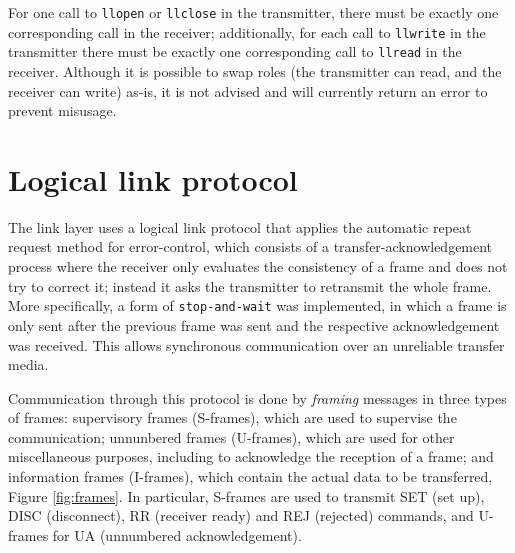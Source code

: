 \documentclass[a4paper, 11pt]{report}
\begin{document}
For one call to \texttt{llopen} or \texttt{llclose} in the transmitter, there must be exactly one corresponding call in the receiver; additionally, for each call to \texttt{llwrite} in the transmitter there must be exactly one corresponding call to \texttt{llread} in the receiver. Although it is possible to swap roles (the transmitter can read, and the receiver can write) as-is, it is not advised and will currently return an error to prevent misusage.

\section{Logical link protocol} \label{sec:LLProtocol}

The link layer uses a logical link protocol that applies the automatic repeat request method for error-control, which consists of a transfer-acknowledgement process where the receiver only evaluates the consistency of a frame and does not try to correct it; instead it asks the transmitter to retransmit the whole frame. More specifically, a form of \texttt{stop-and-wait} was implemented, in which a frame is only sent after the previous frame was sent and the respective acknowledgement was received. This allows synchronous communication over an unreliable transfer media.

Communication through this protocol is done by \textit{framing} messages in three types of frames: supervisory frames (S-frames), which are used to supervise the communication; unnunbered frames (U-frames), which are used for other miscellaneous purposes, including to acknowledge the reception of a frame; and information frames (I-frames), which contain the actual data to be transferred, Figure \ref{fig:frames}. In particular, S-frames are used to transmit SET (set up), DISC (disconnect), RR (receiver ready) and REJ (rejected) commands, and U-frames for UA (unnumbered acknowledgement).
\end{document}
